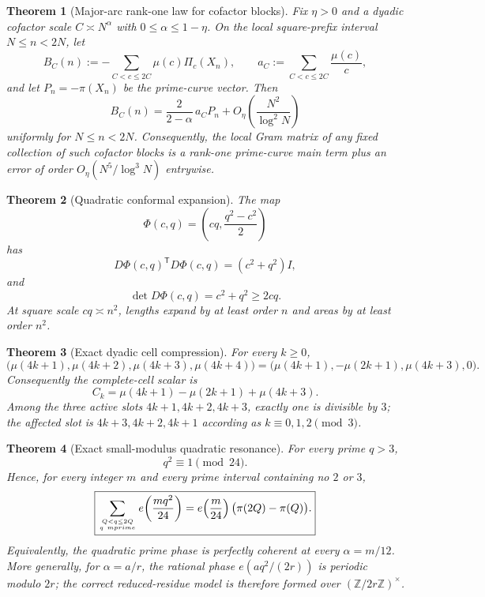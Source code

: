 \documentclass[11pt]{article}
\newtheorem{theorem}{Theorem}[section]
\theoremstyle{definition}
\theoremstyle{remark}
\newcommand{\1}{\mathbf{1}}
\begin{document}
\begin{theorem}[Major-arc rank-one law for cofactor blocks]
\label{thm:intro-major-rank-one}
Fix $\eta>0$ and a dyadic cofactor scale $C\asymp N^\alpha$ with
$0\le\alpha\le1-\eta$.  On the local square-prefix interval
$N\le n<2N$, let
\[
 B_C(n):=-\sum_{C<c\le2C}\mu(c)\Pi_c(X_n),
 \qquad
 a_C:=\sum_{C<c\le2C}\frac{\mu(c)}{c},
\]
and let $P_n=-\pi(X_n)$ be the prime-curve vector.  Then
\[
 \boxed{
 B_C(n)=\frac{2}{2-\alpha}\,a_C P_n
 +O_\eta\!\left(\frac{N^2}{\log^2N}\right)
 }
\]
uniformly for $N\le n<2N$.  Consequently, the local Gram matrix of any
fixed collection of such cofactor blocks is a rank-one prime-curve main
term plus an error of order $O_\eta(N^5/\log^3N)$ entrywise.
\end{theorem}

\begin{theorem}[Quadratic conformal expansion]
\label{thm:intro-jacobian}
The map
\[
 \Phi(c,q)=\left(cq,\frac{q^2-c^2}{2}\right)
\]
has
\[
 D\Phi(c,q)^{\mathsf T}D\Phi(c,q)
 =(c^2+q^2)I,
\]
and
\[
 \det D\Phi(c,q)=c^2+q^2\ge2cq.
\]
At square scale $cq\asymp n^2$, lengths expand by at least order $n$ and areas by at least order $n^2$.
\end{theorem}

\begin{theorem}[Exact dyadic cell compression]
\label{thm:intro-dyadic-cell}
For every $k\ge0$,
\[
 \boxed{
 \bigl(\mu(4k+1),\mu(4k+2),\mu(4k+3),\mu(4k+4)\bigr)
 =\bigl(\mu(4k+1),-\mu(2k+1),\mu(4k+3),0\bigr).
 }
\]
Consequently the complete-cell scalar is
\[
 \boxed{C_k=\mu(4k+1)-\mu(2k+1)+\mu(4k+3).}
\]
Among the three active slots $4k+1,4k+2,4k+3$, exactly one is divisible by $3$; the affected slot is $4k+3,4k+2,4k+1$ according as $k\equiv0,1,2\pmod3$.
\end{theorem}

\begin{theorem}[Exact small-modulus quadratic resonance]
\label{thm:intro-prime-square-24}
For every prime $q>3$,
\[
 \boxed{q^2\equiv1\pmod{24}.}
\]
Hence, for every integer $m$ and every prime interval containing no $2$ or $3$,
\[
 \boxed{
 \sum_{Q<q\le2Q\atop q\ {
m prime}}
 e\!\left(\frac{m q^2}{24}\right)
 =e\!\left(\frac m{24}\right)
 \bigl(\pi(2Q)-\pi(Q)\bigr).
 }
\]
Equivalently, the quadratic prime phase is perfectly coherent at every
$\alpha=m/12$.  More generally, for $\alpha=a/r$, the rational phase
$e(aq^2/(2r))$ is periodic modulo $2r$; the correct reduced-residue model is therefore formed over $(\mathbb Z/2r\mathbb Z)^\times$.
\end{theorem}
\end{document}
